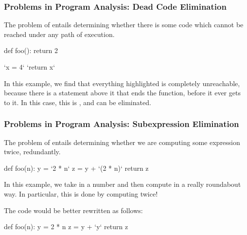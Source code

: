 \documentclass[aspectratio=169, handout]{beamer}
\begin{document}
 \begin{frame}[fragile]
   \frametitle{Problems in Program Analysis: Dead Code Elimination}

   The problem of  entails determining whether
   there is some code which cannot be reached under any path of execution.

   \pause
   \vspace{\fill}

   \begin{codeblock}[language=python]
      def foo():
        return 2

        `x = 4`
        `return x`
   \end{codeblock}

   \pause
   \vspace{\fill}

   In this example, we find that everything highlighted is completely unreachable,
   because there is a  statement above it that ends the function,
   before it ever gets to it. In this case, this is , and
   can be eliminated.
 \end{frame}

 \begin{frame}[fragile]
   \frametitle{Problems in Program Analysis: Subexpression Elimination}

   The problem of  entails determining whether
   we are computing some expression twice, redundantly.

   \pause
   \vspace{\fill}

   \begin{codeblock}[language=python]
      def foo(n):
        y = `2 * n`
        z = y + `(2 * n)`
        return z
   \end{codeblock}

   \pause
   \vspace{\fill}

   In this example, we take in a number  and then compute 
   in a really roundabout way. In particular, this is done by computing  twice!

   \pause
   \vspace{\fill}

   The code would be better rewritten as follows:

   \begin{codeblock}[language=python]
      def foo(n):
        y = 2 * n
        z = y + `y`
        return z
   \end{codeblock}
 \end{frame}
\end{document}
